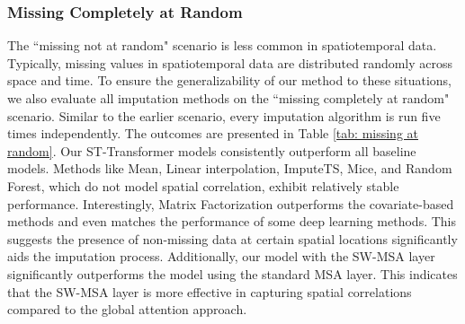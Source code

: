 \documentclass[11pt]{article}
\begin{document}
\subsubsection*{Missing Completely at Random}
The ``missing not at random" scenario is less common in spatiotemporal data. Typically, missing values in spatiotemporal data are distributed randomly across space and time. To ensure the generalizability of our method to these situations, we also evaluate all imputation methods on the ``missing completely at random" scenario. Similar to the earlier scenario, every imputation algorithm is run five times independently. The outcomes are presented in Table \ref{tab: missing at random}. Our ST-Transformer models consistently outperform all baseline models. Methods like Mean, Linear interpolation, ImputeTS, Mice, and Random Forest, which do not model spatial correlation, exhibit relatively stable performance. Interestingly, Matrix Factorization outperforms the covariate-based methods and even matches the performance of some deep learning methods. This suggests the presence of non-missing data at certain spatial locations significantly aids the imputation process. Additionally, our model with the SW-MSA layer significantly outperforms the model using the standard MSA layer. This indicates that the SW-MSA layer is more effective in capturing spatial correlations compared to the global attention approach.
\end{document}
